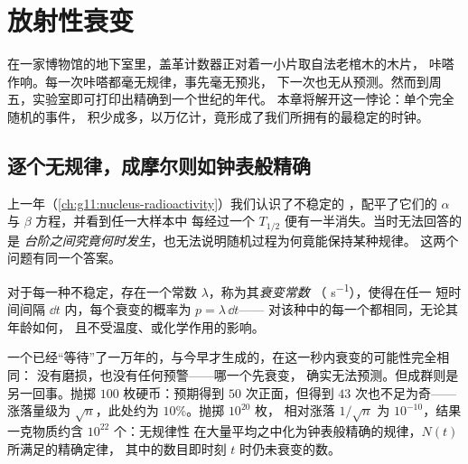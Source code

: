 \chapter{放射性衰变}\label{ch:g12:radioactive-decay}

在一家博物馆的地下室里，盖革计数器正对着一小片取自法老棺木的木片，
咔嗒作响。每一次咔嗒都毫无规律，事先毫无预兆，
下一次也无从预测。然而到周五，实验室即可打印出精确到一个世纪的年代。
本章将解开这一悖论：单个完全随机的事件，
积少成多，以万亿计，竟形成了我们所拥有的最稳定的时钟。

\section{逐个无规律，成摩尔则如钟表般精确}

上一年（\cref{ch:g11:nucleus-radioactivity}）我们认识了不稳定的
，配平了它们的 $\alpha$ 与 $\beta$ 方程，并看到任一大样本中
每经过一个 $T_{1/2}$ 便有一半消失。当时无法回答的是
\emph{台阶之间究竟何时发生}，也无法说明随机过程为何竟能保持某种规律。
这两个问题有同一个答案。

\begin{definition}[衰变常数]\label{def:g12:radioactive-decay:lambda}
对于每一种不稳定，存在一个常数 $\lambda$，称为其\emph{衰变常数}
（ \unit{s^{-1}}），使得在任一
短时间间隔 $\dd t$ 内，每个衰变的概率为 $p = \lambda\,\dd t$——
对该种中的每一个都相同，无论其年龄如何，
且不受温度、或化学作用的影响。
\end{definition}

\begin{remark}\label{rem:g12:radioactive-decay:crowds}
一个已经“等待”了一万年的，与今早才生成的，在这一秒内衰变的可能性完全相同：
没有磨损，也没有任何预警——哪一个先衰变，
确实无法预测。但成群则是另一回事。抛掷
$100$ 枚硬币：预期得到 $50$ 次正面，但得到 $43$ 次也不足为奇——
涨落量级为 $\sqrt n$，此处约为 $10\%$。抛掷 $10^{20}$ 枚，
相对涨落 $1/\sqrt n$ 为 $10^{-10}$，结果
一克物质约含 $10^{22}$ 个：无规律性
在大量平均之中化为钟表般精确的规律，$N(t)$ 所满足的精确定律，
其中的数目即时刻 $t$ 时仍未衰变的数。
\end{remark}

